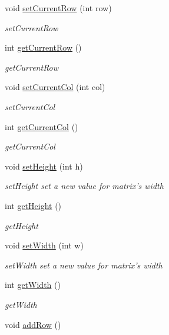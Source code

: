 \begin{DoxyCompactItemize}
\item 
void \hyperlink{classmatrix_abbb6b521ed08e05009ccaf3334cbbff4}{set\-Current\-Row} (int row)
\begin{DoxyCompactList}\small\item\em set\-Current\-Row \end{DoxyCompactList}\item 
int \hyperlink{classmatrix_a57bd8617d51909af1a0aa6b8572b74c0}{get\-Current\-Row} ()
\begin{DoxyCompactList}\small\item\em get\-Current\-Row \end{DoxyCompactList}\item 
void \hyperlink{classmatrix_af151620cb299b5ba6f70181b19c3c968}{set\-Current\-Col} (int col)
\begin{DoxyCompactList}\small\item\em set\-Current\-Col \end{DoxyCompactList}\item 
int \hyperlink{classmatrix_aebf21af96446c1b1b093add2b5aa4f9c}{get\-Current\-Col} ()
\begin{DoxyCompactList}\small\item\em get\-Current\-Col \end{DoxyCompactList}\item 
void \hyperlink{classmatrix_addc59e72e7bfc9c69dfd9711b62ec9eb}{set\-Height} (int h)
\begin{DoxyCompactList}\small\item\em set\-Height set a new value for matrix's width \end{DoxyCompactList}\item 
int \hyperlink{classmatrix_a43c43a9e47b8ea6f849c200bc38db8a4}{get\-Height} ()
\begin{DoxyCompactList}\small\item\em get\-Height \end{DoxyCompactList}\item 
void \hyperlink{classmatrix_a18c111dea992bae1d49513c03f6003bc}{set\-Width} (int w)
\begin{DoxyCompactList}\small\item\em set\-Width set a new value for matrix's width \end{DoxyCompactList}\item 
int \hyperlink{classmatrix_a7c78a2951df55e8f69ecdc10a7b9794c}{get\-Width} ()
\begin{DoxyCompactList}\small\item\em get\-Width \end{DoxyCompactList}\item 
\hypertarget{classmatrix_a916f7b749294e6aa54832be4c1783bc7}{void \hyperlink{classmatrix_a916f7b749294e6aa54832be4c1783bc7}{add\-Row} ()}\label{classmatrix_a916f7b749294e6aa54832be4c1783bc7}


\end{DoxyCompactItemize}
